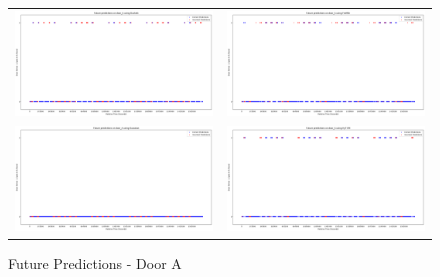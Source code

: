 \begin{figure}
  \begin{tabular}{cc}
    {\includegraphics[width = 3in]{images/results/Future_door_A_Duckett.png}} &
    {\includegraphics[width = 3in]{images/results/Future_door_A_FreMEn.png}} \\
    {\includegraphics[width = 3in]{images/results/Future_door_A_Gaussian.png}} &
    {\includegraphics[width = 3in]{images/results/Future_door_A_HyT-EM.png}} \\
  \end{tabular}
  \caption{Future Predictions - Door A}
\end{figure} \\ \\

